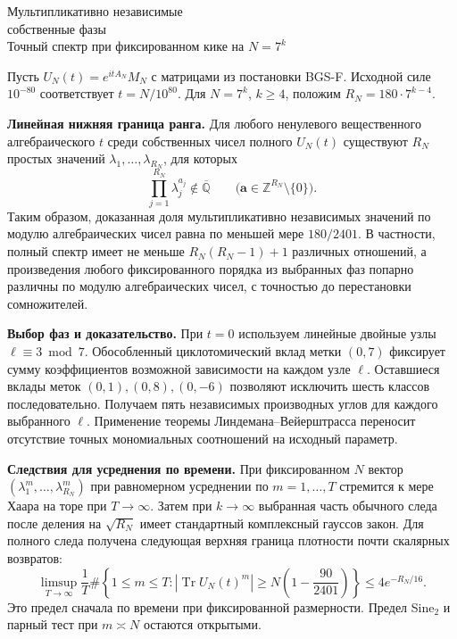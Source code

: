 \documentclass[11pt,a4paper]{article}
\newcommand{\Tr}{\operatorname{Tr}}
\newcommand{\Z}{\mathbb Z}
\newcommand{\subt}[1]{\par\medskip\noindent\textbf{#1.}\quad}
\begin{document}
\begin{center}{\LARGE\sffamily Мультипликативно независимые\\[3pt]собственные фазы}\\[6pt]
{\large Точный спектр при фиксированном кике на \(N=7^k\)}
\end{center}

Пусть \(U_N(t)=e^{itA_N}M_N\) с матрицами из постановки BGS-F. Исходной силе \(10^{-80}\) соответствует \(t=N/10^{80}\). Для \(N=7^k\), \(k\ge4\), положим \(R_N=180\cdot7^{k-4}\).

\subt{Линейная нижняя граница ранга}
Для любого ненулевого вещественного алгебраического \(t\) среди собственных чисел полного \(U_N(t)\) существуют \(R_N\) простых значений \(\lambda_1,\ldots,\lambda_{R_N}\), для которых
\[
      \prod_{j=1}^{R_N}\lambda_j^{a_j}\notin\overline{\mathbb Q}
         \qquad\bigl(\mathbf a\in\Z^{R_N}\setminus\{0\}\bigr).
\]
Таким образом, доказанная доля мультипликативно независимых значений по модулю алгебраических чисел равна по меньшей мере \(180/2401\). В частности, полный спектр имеет не меньше \(R_N(R_N-1)+1\) различных отношений, а произведения любого фиксированного порядка из выбранных фаз попарно различны по модулю алгебраических чисел, с точностью до перестановки сомножителей.

\subt{Выбор фаз и доказательство}
При \(t=0\) используем линейные двойные узлы \(\ell\equiv3\bmod7\). Обособленный циклотомический вклад метки \((0,7)\) фиксирует сумму коэффициентов возможной зависимости на каждом узле \(\ell\). Оставшиеся вклады меток \((0,1),(0,8),(0,-6)\) позволяют исключить шесть классов последовательно. Получаем пять независимых производных углов для каждого выбранного \(\ell\). Применение теоремы Линдемана--Вейерштрасса переносит отсутствие точных мономиальных соотношений на исходный параметр.

\subt{Следствия для усреднения по времени}
При фиксированном \(N\) вектор \((\lambda_1^m,\ldots,\lambda_{R_N}^m)\) при равномерном усреднении по \(m=1,\ldots,T\) стремится к мере Хаара на торе при \(T\to\infty\). Затем при \(k\to\infty\) выбранная часть обычного следа после деления на \(\sqrt{R_N}\) имеет стандартный комплексный гауссов закон. Для полного следа получена следующая верхняя граница плотности почти скалярных возвратов:
\[
 \limsup_{T\to\infty}\frac1T\#\left\{1\le m\le T:
        |\Tr U_N(t)^m|\ge N\left(1-\frac{90}{2401}\right)\right\}
                   \le 4e^{-R_N/16}.
\]
Это предел сначала по времени при фиксированной размерности. Предел Sine\(_2\) и парный тест при \(m\asymp N\) остаются открытыми.
\end{document}
